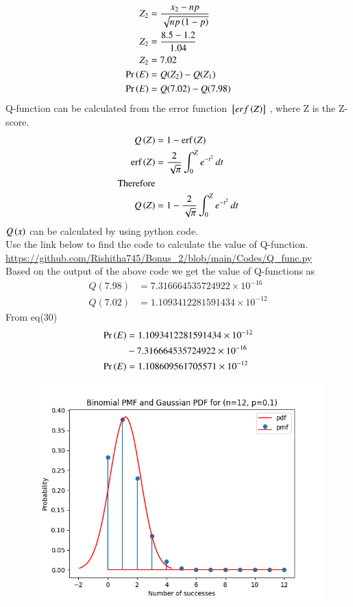 \documentclass[journal,12pt,twocolumn]{IEEEtran}
\begin{document}
\begin{enumerate}[label=(\Roman*), align=left]
\begin{align}
    Z_2 &=\frac{x_2-np}{\sqrt{np\left(1-p\right)}}\nonumber\\
    Z_2 &= \frac{8.5-1.2}{1.04}\nonumber\\
    Z_2 &= 7.02\\
    \Pr\left(E\right) &=Q(Z_2)-Q(Z_1)\\
    \Pr\left(E\right) &=Q(7.02)-Q(7.98)
    \end{align}
Q-function can be calculated from the error function ${}\left[erf\left(Z\right)\right]$ , where Z is the Z- score.
\begin{align}
    Q\left(Z\right)&=1-\text{erf}\left(Z\right)\\
    \text{erf}\left(Z\right)&=\frac{2}{\sqrt{\pi}}\int_{0}^{Z} e^{-t^2} \, dt\\
    \text{Therefore}\\
    Q\left(Z\right)&=1-\frac{2}{\sqrt{\pi}}\int_{0}^{Z} e^{-t^2} \, dt
    \end{align}
$Q\left(x\right)$ can be calculated by using python code.
\\Use the link below to find the code to calculate the value of Q-function.
\\\url{https://github.com/Rishitha745/Bonus_2/blob/main/Codes/Q_func.py}
\\Based on the output of the above code we get the value of Q-functions as
\begin{align}
    Q(7.98)&=7.316664535724922\times 10^{-16}\\
    Q(7.02)&=1.1093412281591434\times 10^{-12}
    \end{align}
From eq(30)
\begin{align}
    \Pr\left(E\right)&=1.1093412281591434\times 10^{-12}\nonumber\\
    &-7.316664535724922\times 10^{-16}\nonumber\\
    \Pr\left(E\right)&=1.108609561705571\times 10^{-12}
    \end{align}
\begin{figure}[h]
\centering
\includegraphics[width=\columnwidth]{./figs/graph.png}

\end{figure}
\end{enumerate}
\end{document}
